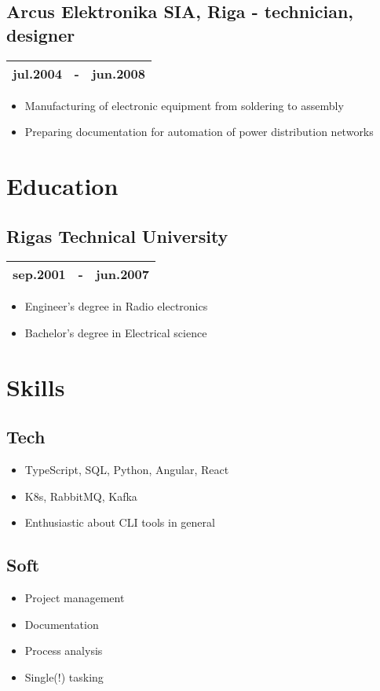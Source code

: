 \documentclass[10pt]{article}
\begin{document}
\begin{multicols*}{2}
\subsection*{Arcus Elektronika SIA, \textmd{Riga} - \textmd{technician, designer}}
\begin{tabular}{lll}
    jul.2004 & - & jun.2008\\
    \hline
\end{tabular}
\begin{itemize}
    \item Manufacturing of electronic equipment from soldering to assembly
    \item Preparing documentation for automation of power distribution networks
\end{itemize}
\section*{Education}
\subsection*{Rigas Technical University}
\begin{tabular}{lll}
    sep.2001 & - & jun.2007\\
    \hline
\end{tabular}
\begin{itemize}
    \item Engineer's degree in Radio electronics
    \item Bachelor's degree in Electrical science
\end{itemize}
\section*{Skills}
\subsection*{Tech}
\begin{itemize}
    \item TypeScript, SQL, Python, Angular, React
    \item K8s, RabbitMQ, Kafka
    \item Enthusiastic about CLI tools in general
\end{itemize}
\subsection*{Soft}
\begin{itemize}
    \item Project management
    \item Documentation
    \item Process analysis 
    \item Single(!) tasking
\end{itemize}

\end{multicols*}
\end{document}
